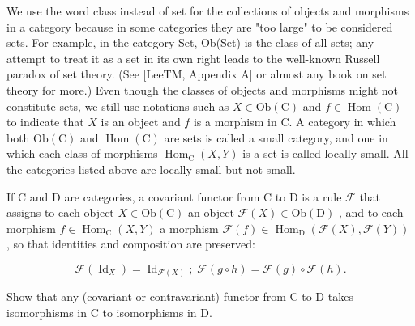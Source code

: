 \begin{definition}
\label{def:3-19-extra-3}
\mathlibok
We use the word class instead of set for the collections of objects and morphisms in a category because in some categories they are "too large" to be considered sets. For example, in the category Set, Ob(Set) is the class of all sets; any attempt to treat it as a set in its own right leads to the well-known Russell paradox of set theory. (See [LeeTM, Appendix A] or almost any book on set theory for more.) Even though the classes of objects and morphisms might not constitute sets, we still use notations such as $X \in  \mathrm{{Ob}}\left( \mathrm{C}\right)$ and $f \in  \operatorname{Hom}\left( \mathrm{C}\right)$ to indicate that $X$ is an object and $f$ is a morphism in C. A category in which both $\mathrm{{Ob}}\left( \mathrm{C}\right)$ and $\operatorname{Hom}\left( \mathrm{C}\right)$ are sets is called a small category, and one in which each class of morphisms ${\operatorname{Hom}}_{\mathrm{C}}\left( {X, Y}\right)$ is a set is called locally small. All the categories listed above are locally small but not small.
\end{definition}

\begin{definition}
\label{def:3-19-extra-4}
\mathlibok
If $\mathrm{C}$ and $\mathrm{D}$ are categories, a covariant functor from $\mathrm{C}$ to $\mathrm{D}$ is a rule $\mathcal{F}$ that assigns to each object $X \in  \mathrm{{Ob}}\left( \mathrm{C}\right)$ an object $\mathcal{F}\left( X\right)  \in  \mathrm{{Ob}}\left( \mathrm{D}\right)$ , and to each morphism $f \in  {\operatorname{Hom}}_{\mathrm{C}}\left( {X, Y}\right)$ a morphism $\mathcal{F}\left( f\right)  \in  {\operatorname{Hom}}_{\mathrm{D}}\left( {\mathcal{F}\left( X\right) ,\mathcal{F}\left( Y\right) }\right)$ , so that identities and composition are preserved:

\[
\mathcal{F}\left( {\operatorname{Id}}_{X}\right)  = {\operatorname{Id}}_{\mathcal{F}\left( X\right) };\;\mathcal{F}\left( {g \circ  h}\right)  = \mathcal{F}\left( g\right)  \circ  \mathcal{F}\left( h\right) .
\]
\end{definition}

\begin{exercise}
\label{exer:3-27}
\mathlibok
{}
Show that any (covariant or contravariant) functor from C to D takes isomorphisms in C to isomorphisms in D.
\end{exercise}


